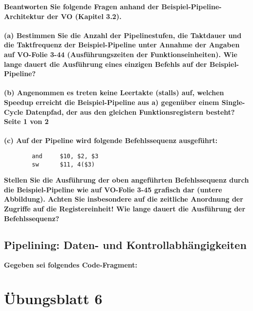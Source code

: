 \documentclass[11pt]{article}
\begin{document}
    \textbf{Beantworten Sie folgende Fragen anhand der Beispiel-Pipeline-Architektur der VO (Kapitel 3.2).\\\\
    (a) Bestimmen Sie die Anzahl der Pipelinestufen, die Taktdauer und die Taktfrequenz der
    Beispiel-Pipeline unter Annahme der Angaben auf VO-Folie 3-44 (Ausführungszeiten der
    Funktionseinheiten). Wie lange dauert die Ausführung eines einzigen Befehls auf der
    Beispiel-Pipeline?\\\\
    (b) Angenommen es treten keine Leertakte (stalls) auf, welchen Speedup erreicht die
    Beispiel-Pipeline aus a) gegenüber einem Single-Cycle Datenpfad, der aus den gleichen
    Funktionsregistern besteht?\\
    Seite 1 von 2\\\\
    (c) Auf der Pipeline wird folgende Befehlssequenz ausgeführt:\\}
    \begin{verbatim}
        and     $10, $2, $3
        sw      $11, 4($3)
    \end{verbatim}

    \textbf{    Stellen Sie die Ausführung der oben angeführten Befehlssequenz durch die Beispiel-Pipeline
    wie auf VO-Folie 3-45 grafisch dar (untere Abbildung). Achten Sie insbesondere auf die
    zeitliche Anordnung der Zugriffe auf die Registereinheit! Wie lange dauert die Ausführung der
    Befehlssequenz?}


    \subsection{Pipelining: Daten- und Kontrollabhängigkeiten}
    \textbf{Gegeben sei folgendes Code-Fragment:}

    \begin{center}
        
    
    \end{center}

\section{Übungsblatt 6}
	
	
\end{document}
